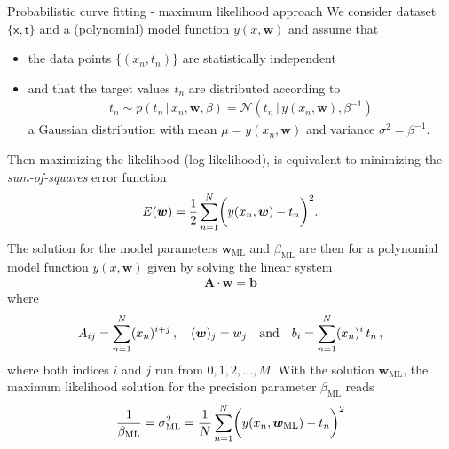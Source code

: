\documentclass[11pt, DINA4, fleqn]{amsart}
\def\vw{\boldsymbol{w}\xspace}
\def\vb{\boldsymbol{b}\xspace}
\def\mA{\boldsymbol{A}\xspace}
\begin{document}
\newpage


\begin{mybox_tc3}{Probabilistic curve fitting - maximum likelihood approach}
We consider dataset $\{\boldsymbol{\mathsf{x}}, \boldsymbol{\mathsf{t}}\}$
and a (polynomial) model function $y(x,\bm{w})$ and
assume that
\begin{itemize}
	\item the data points $\{(x_n, t_n)\}$ are statistically independent
	\item and that the target values $t_n$ are distributed according to
	\begin{align}
	t_n  \sim p(t_n \, | \, x_n, \bm{w}, \beta) = \mathcal{N}\left(
	t_n \, \bigl| \, y(x_n,\bm{w}), \beta^{-1}\right) 
	\end{align}
	a Gaussian distribution with mean $\mu = y(x_n, \bm{w})$ and variance $\sigma^2 = \beta^{-1}$.
\end{itemize}
	Then maximizing the likelihood (log likelihood), is equivalent to minimizing the \emph{sum-of-squares} error function
	\begin{align}
	E(\bm{w}) =\dfrac{1}{2} \sum\displaylimits_{n=1}^{N} \biggl(y(x_n, \bm{w}) - t_n\biggl)^2.
	\end{align}
The solution for the model parameters $\bm{w}_{\text{ML}}$ and $\beta_{\text{ML}}$ are then for a polynomial model function $y(x,\bm{w})$ given by
solving the linear system
\begin{align}
\mA \cdot \vw = \vb
\label{eq:linearSystem}
\end{align}
where
\begin{align}
A_{ij} = \sum \displaylimits_{n = 1}^{N} (x_n)^{i + j} \, , \quad
(\vw)_j = w_j \quad \text{and} \quad
b_i = \sum \displaylimits_{n = 1}^{N} (x_n)^{i} \, t_n \, ,
\end{align}
where both indices $i$ and $j$ run from $0, 1, 2, \dotsc, M$.
With the solution $\bm{w}_{\text{ML}}$, the maximum likelihood solution for the precision parameter $\beta_{\text{ML}}$ reads
\begin{align}
\dfrac{1}{\beta_{\text{ML}}} = \sigma^2_{\text{ML}}= \dfrac{1}{N} \sum\displaylimits_{n=1}^{N} \biggl(y(x_n, \bm{w}_{\text{ML}}) - t_n\biggl)^2
\end{align}
\end{mybox_tc3}

\end{document}

